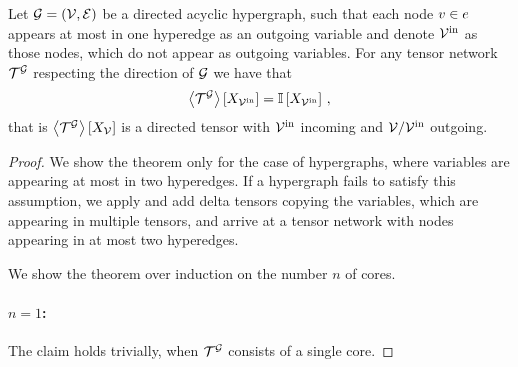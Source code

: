 \begin{theorem}
    \label{the:conditionalContractionPreservation}
    Let $\mathcal{G}=(\mathcal{V},\mathcal{E})$ be a directed acyclic hypergraph, such that each node $v\in e$ appears at most in one hyperedge as an outgoing variable and denote $\mathcal{V}^{\mathrm{in}}$ as those nodes, which do not appear as outgoing variables.
    For any tensor network $\mathcal{T}^{\mathcal{G}}$ respecting the direction of $\mathcal{G}$ we have that
    \[ \left\langle \mathcal{T}^{\mathcal{G}}\right\rangle \left[ X_{\mathcal{V}^{\mathrm{in}}} \right] = \mathbb{I}\left[X_{\mathcal{V}^{\mathrm{in}}}\right] \, , \]
    that is $\left\langle \mathcal{T}^{\mathcal{G}}\right\rangle \left[ X_{\mathcal{V}} \right]$ is a directed tensor with $\mathcal{V}^{\mathrm{in}}$ incoming and $\mathcal{V}/\mathcal{V}^{\mathrm{in}}$ outgoing.
\end{theorem}
\begin{proof}
    We show the theorem only for the case of hypergraphs, where variables are appearing at most in two hyperedges.
    If a hypergraph fails to satisfy this assumption, we apply  and add delta tensors copying the variables, which are appearing in multiple tensors, and arrive at a tensor network with nodes appearing in at most two hyperedges.

    We show the theorem over induction on the number $n$ of cores.

    \paragraph{$n=1$:} The claim holds trivially, when $\mathcal{T}^{\mathcal{G}}$ consists of a single core.


\end{proof}
